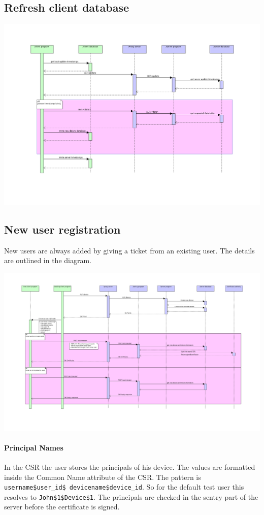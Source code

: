 \documentclass[12pt]{report}
\begin{document}
\subsection{Refresh client database}

\includegraphics[width=\linewidth]{diagrams/Refreshment.png}

\subsection{New user registration}

New users are always added by giving a ticket from an existing user. The details are outlined in the diagram. 

\includegraphics[width=\linewidth]{diagrams/new-user-registration.png}

\paragraph{Principal Names}
In the CSR the user stores the principals of his device. The values are formatted inside the Common Name attribute of the CSR. The pattern is \texttt{username\$user\_id\$ devicename\$device\_id}. So for the default test user this resolves to \texttt{John\$1\$Device\$1}. 
The principals are checked in the sentry part of the server before the certificate is signed. 
\end{document}
